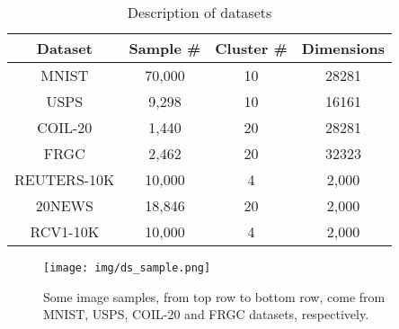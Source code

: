 \begin{table}[htbp]
	\caption{Description of datasets}
	\begin{center}
		\begin{tabular}{|c|c|c|c|}
			\hline
			Dataset                        & Sample \# & Cluster \# & Dimensions \\ \hline
			MNIST                          & 70,000      & 10      & 28281    \\ \hline
			USPS                             & 9,298        & 10      & 16161    \\ \hline
			COIL-20                       & 1,440         & 20      & 28281    \\ \hline
			FRGC                             & 2,462        & 20      & 32323    \\ \hline
			REUTERS-10K              &10,000       &4         &2,000 \\ \hline    
			20NEWS                       &18,846       &20         &2,000 \\ \hline 
			RCV1-10K                      &10,000       &4         &2,000 \\ \hline 
		\end{tabular}
		\label{tab1_ds}
	\end{center}
\end{table}
\begin{figure}[htbp]
	\centerline{\texttt{[image: img/ds\_sample.png]}}
	\caption{Some image samples, from top row to bottom row, come from MNIST, USPS, COIL-20 and FRGC datasets, respectively.}
	\label{fig_samples}
\end{figure}

